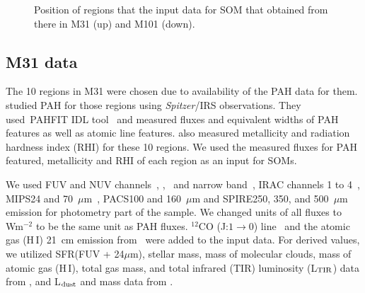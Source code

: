   \begin{figure}
    \hfill
    \caption{Position of regions that the input data for SOM that obtained from there in M31 (up) and M101 (down).}
    \label{fig:dummy}
  \end{figure}

    \subsection{M31 data}
     \label{Sec: data_M31_SOMN} 
     
     The 10 regions in M31 were chosen due to availability of the PAH data for them. 
     \cite{Dim15} studied PAH for those regions using {\it Spitzer}/IRS observations. 
     They used~{\sc PAHFIT IDL} tool~\citep{Smith07b} and measured fluxes and equivalent widths of PAH features as well as atomic line features.
     \cite{Dim15} also measured metallicity and radiation hardness index (RHI) for these 10 regions.
     We used the measured fluxes for PAH featured, metallicity and RHI of each region as an input for SOMs.
     
 We used \GALEX FUV and NUV channels~\citep{Martin05}, \halpha, \sii~and \oiii narrow band~\citep{Massey07}, IRAC channels 1 to 4~\citep{Barmby06}, MIPS24 and 70~$\mu$m~\citep{Gordon06}, PACS100 and 160~$\mu$m and SPIRE250, 350, and 500~$\mu$m~\citep{Fritz12} emission for photometry part of the sample.
     We changed units of all fluxes to Wm$^{-2}$ to be the same unit as PAH fluxes.
     $^{12}$CO (J:$1\rightarrow0$) line~\citep{Nieten06} and the atomic gas (H\,{\sc I}) 21~cm emission from~\cite{Chemin09} were added to the input data. 
     For derived values, we utilized SFR(FUV + 24$\mu$m), stellar mass, mass of molecular clouds, mass of atomic gas (H\,{\sc I}), total gas mass, and total infrared (TIR) luminosity (L$_{\rm TIR}$) data from \cite{Rahmani16}, and L$_{\rm dust}$ and mass data from \cite{Draine14}.
     
